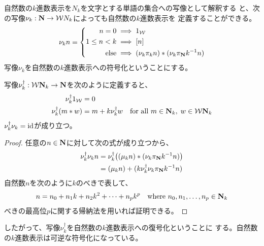 	\begin{todo}[ここまで]\label{todo:ここまで} %
	\end{todo} %

	自然数の$k$進数表示を$N_k$を文字とする単語の集合への写像として解釈する
	と、次の写像$\nu_k:\mathbf{N}\to{\ensuremath{{\mathcal{W}}}} N_k$によっても自然数の$k$進数表示を
	定義することができる。
	\begin{equation*}\begin{split}
		\nu_k n = \left\{\begin{split}
			n = 0 &\implies 1_\Word \\
			1\le n < k &\implies [n] \\
			\text{else} &\implies (\nu_k\pi_kn) * (\nu_k\pi_\sizen k^{-1}n) \\
		\end{split}\right. \\ %
	\end{split}\end{equation*}
	写像$\nu_k$を自然数の$k$進数表示への符号化ということにする。

	写像$\nu_k^\dag:{{\mathcal{W}}}\mathbf{N}_k\to\mathbf{N}$を次のように定義すると、
	\begin{equation*}\begin{split}
		\nu_k^\dag1_{{\mathcal{W}}} &= 0 \\
		\nu_k^\dag(m*w) &= m + k\nu_k^\dag w
		\quad\text{for all }m\in\mathbf{N}_k,\;w\in {\ensuremath{{\mathcal{W}}}}\mathbf{N}_k
	\end{split}\end{equation*}
	$\nu_k^\dag\nu_k={\operatorname{id}}$が成り立つ。
	\begin{proof} 任意の$n\in\mathbf{N}$に対して次の式が成り立つから、
		\begin{equation*}\begin{split}
			\nu_k^\dag\nu_kn 
			&= \nu_k^\dag\bigl((\mu_kn) * (\nu_k\pi_{\mathbf{N}} k^{-1}n)\bigr) \\
			&= (\mu_kn) + (k\nu_k^\dag\nu_k\pi_{\mathbf{N}} k^{-1}n) \\
		\end{split}\end{equation*}
		自然数$n$を次のように$k$のべきで表して、
		\begin{equation*}\begin{split}
			n = n_0 + n_1k + n_2k^2 + \cdots + n_pk^p
			\quad\text{where } n_0,n_1,\dots,n_p\in\mathbf{N}_k
		\end{split}\end{equation*}
		べきの最高位$p$に関する帰納法を用いれば証明できる。
	\end{proof}
	したがって、写像$\nu_k^\dag$を自然数の$k$進数表示への復号化ということに
	する。自然数の$k$進数表示は可逆な符号化になっている。
	
